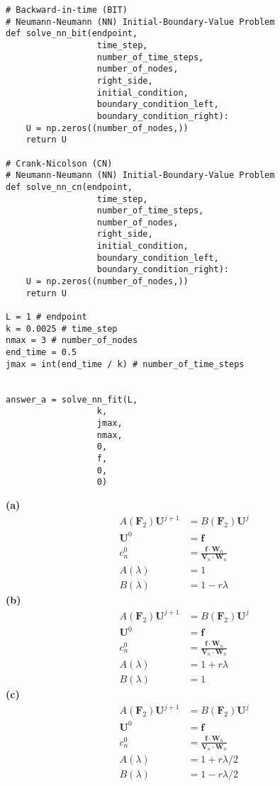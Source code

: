 \documentclass{amsbook}%
\theoremstyle{plain}
\numberwithin{equation}{section}
\begin{document}
\begin{small}
\begin{verbatim}
# Backward-in-time (BIT)
# Neumann-Neumann (NN) Initial-Boundary-Value Problem
def solve_nn_bit(endpoint,
                  time_step,
                  number_of_time_steps,
                  number_of_nodes,
                  right_side,
                  initial_condition,
                  boundary_condition_left,
                  boundary_condition_right):
    U = np.zeros((number_of_nodes,))
    return U

# Crank-Nicolson (CN)
# Neumann-Neumann (NN) Initial-Boundary-Value Problem
def solve_nn_cn(endpoint,
                  time_step,
                  number_of_time_steps,
                  number_of_nodes,
                  right_side,
                  initial_condition,
                  boundary_condition_left,
                  boundary_condition_right):
    U = np.zeros((number_of_nodes,))
    return U

L = 1 # endpoint
k = 0.0025 # time_step
nmax = 3 # number_of_nodes
end_time = 0.5
jmax = int(end_time / k) # number_of_time_steps


answer_a = solve_nn_fit(L,
                  k,
                  jmax,
                  nmax,
                  0,
                  f,
                  0,
                  0)
\end{verbatim}
\end{small}
		
		\noindent\textbf{(a)}
		\begin{align}
			A(\mathbf{F}_2)\mathbf{U}^{j+1} & = B(\mathbf{F}_2)\mathbf{U}^j\\
			\mathbf{U}^0 & = \mathbf{f}\\
			c^0_n & = \frac{\mathbf{f}\cdot\mathbf{W}_n}{\mathbf{V}_n\cdot\mathbf{W}_n}\\
			A(\lambda) & = 1\\
			B(\lambda) & = 1-r\lambda
		\end{align}
		\textbf{(b)}
		\begin{align}
			A(\mathbf{F}_2)\mathbf{U}^{j+1} & = B(\mathbf{F}_2)\mathbf{U}^j\\
			\mathbf{U}^0 & = \mathbf{f}\\
			c^0_n & = \frac{\mathbf{f}\cdot\mathbf{W}_n}{\mathbf{V}_n\cdot\mathbf{W}_n}\\
			A(\lambda) & = 1+r\lambda\\
			B(\lambda) & = 1
		\end{align}
		\textbf{(c)}
		\begin{align}
			A(\mathbf{F}_2)\mathbf{U}^{j+1} & = B(\mathbf{F}_2)\mathbf{U}^j\\
			\mathbf{U}^0 & = \mathbf{f}\\
			c^0_n & = \frac{\mathbf{f}\cdot\mathbf{W}_n}{\mathbf{V}_n\cdot\mathbf{W}_n}\\
			A(\lambda) & = 1+r\lambda/2\\
			B(\lambda) & = 1-r\lambda/2
		\end{align}
				
\end{document}
